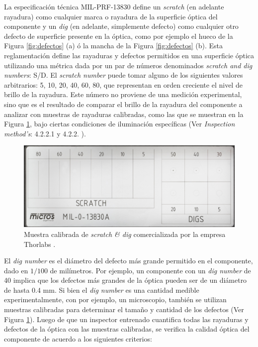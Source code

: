 \hspace{0.5cm}La especificación técnica MIL-PRF-13830 define un \textit{scratch} (en adelante rayadura) como cualquier marca o rayadura de la superficie óptica del componente y un \textit{dig} (en adelante, simplemente defecto) como cualquier otro defecto de superficie presente en la óptica, como por ejemplo el hueco de la Figura \ref{fig:defectos} (a) ó la mancha de la Figura \ref{fig:defectos} (b). Esta reglamentación define las rayaduras y defectos permitidos en una superficie óptica utilizando una métrica dada por un par de números denominados \textit{scratch and dig numbers}: S/D. El \textit{scratch number} puede tomar alguno de los siguientes valores arbitrarios: 5, 10, 20, 40, 60, 80, que representan en orden creciente el nivel de brillo de la rayadura. Este número no proviene de una medición experimental, sino que es el resultado de comparar el brillo de la rayadura del componente a analizar con muestras de rayaduras calibradas, como las que se muestran en la Figura \ref{fig:scratchanddig}, bajo ciertas condiciones de iluminación específicas (Ver \textit{Inspection method's}: 4.2.2.1 y 4.2.2. \cite{milprf}).
\begin{figure}
	\centering
	\includegraphics[scale=0.8]{Figs/cuantificaciondefectos/paddlecalibration.png}
	\caption{Muestra calibrada de \textit{scratch \& dig} comercializada por la empresa Thorlabs \cite{sdstdthor}.}
	\label{fig:scratchanddig}
\end{figure}
El \textit{dig number} es el diámetro del defecto más grande permitido en el componente, dado en $1/100$ de milímetros. Por ejemplo, un componente con un \textit{dig number} de 40 implica que los defectos más grandes de la óptica pueden ser de un diámetro de hasta 0.4 mm. Si bien el \textit{dig number} es una cantidad medible experimentalmente, con por ejemplo, un microscopio, también se utilizan muestras calibradas para determinar el tamaño y cantidad de los defectos (Ver Figura \ref{fig:scratchanddig}). Luego de que un inspector entrenado cuantifica todas las rayaduras y defectos de la óptica con las muestras calibradas, se verifica la calidad óptica del componente de acuerdo a los siguientes criterios:
